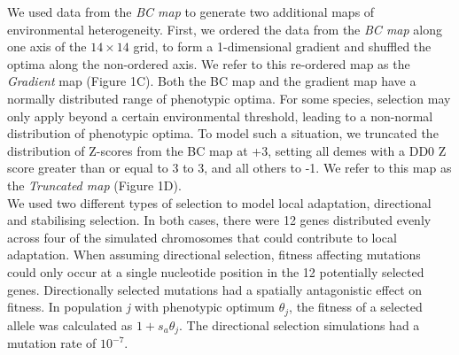 \documentclass[10pt,twoside,lineno, twocolumn]{GSA_format}
\begin{document}
We used data from the \textit{BC map} to generate two additional maps of environmental heterogeneity. First, we ordered the data from the \textit{BC map} along one axis of the $14\times14$ grid, to form a 1-dimensional gradient and shuffled the optima along the non-ordered axis. We refer to this re-ordered map as the \textit{Gradient} map (Figure 1C). Both the BC map and the gradient map have a normally distributed range of phenotypic optima. For some species, selection may only apply beyond a certain environmental threshold, leading to a non-normal distribution of phenotypic optima. To model such a situation, we truncated the distribution of Z-scores from the BC map at +3, setting all demes with a DD0 Z score greater than or equal to 3 to 3, and all others to -1. We refer to this map as the \textit{Truncated map} (Figure 1D).\\





We used two different types of selection to model local adaptation, directional and stabilising selection. In both cases, there were 12 genes distributed evenly across four of the simulated chromosomes that could contribute to local adaptation. When assuming directional selection, fitness affecting mutations could only occur at a single nucleotide position in the 12 potentially selected genes. Directionally selected mutations had a spatially antagonistic effect on fitness. In population \textit{j} with phenotypic optimum $\theta_j$, the fitness of a selected allele was calculated as $1 + s_a\theta_j$. The directional selection simulations had a mutation rate of $10^{-7}$.  \\
\end{document}
